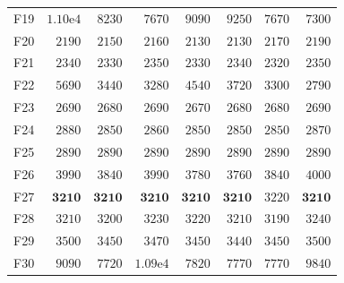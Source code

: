 \begin{tabular}{lrrrrrrr}
F19 & $1.10\mathrm{e}{4}$ & $8230$ & $7670$ & $9090$ & $9250$ & $7670$ & $7300$ \\
F20 & $2190$ & $2150$ & $2160$ & $2130$ & $2130$ & $2170$ & $2190$ \\
F21 & $2340$ & $2330$ & $2350$ & $2330$ & $2340$ & $2320$ & $2350$ \\
F22 & $5690$ & $3440$ & $3280$ & $4540$ & $3720$ & $3300$ & $2790$ \\
F23 & $2690$ & $2680$ & $2690$ & $2670$ & $2680$ & $2680$ & $2690$ \\
F24 & $2880$ & $2850$ & $2860$ & $2850$ & $2850$ & $2850$ & $2870$ \\
F25 & $2890$ & $2890$ & $2890$ & $2890$ & $2890$ & $2890$ & $2890$ \\
F26 & $3990$ & $3840$ & $3990$ & $3780$ & $3760$ & $3840$ & $4000$ \\
F27 & $\mathbf{3210}$ & $\mathbf{3210}$ & $\mathbf{3210}$ & $\mathbf{3210}$ & $\mathbf{3210}$ & $3220$ & $\mathbf{3210}$ \\
F28 & $3210$ & $3200$ & $3230$ & $3220$ & $3210$ & $3190$ & $3240$ \\
F29 & $3500$ & $3450$ & $3470$ & $3450$ & $3440$ & $3450$ & $3500$ \\
F30 & $9090$ & $7720$ & $1.09\mathrm{e}{4}$ & $7820$ & $7770$ & $7770$ & $9840$ \\
\bottomrule
\end{tabular}
